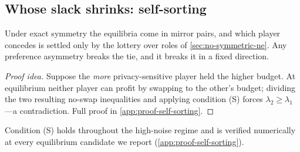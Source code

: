 \subsection{Whose slack shrinks: self-sorting}
\label{sec:self-sorting}

Under exact symmetry the equilibria come in mirror pairs, and which
player concedes is settled only by the lottery over roles of
\cref{sec:no-symmetric-ne}. Any preference asymmetry breaks the
tie, and it breaks it in a fixed direction.


\begin{proof}[Proof idea]
Suppose the \emph{more} privacy-sensitive player held the higher
budget. At equilibrium neither player can profit by swapping to the
other's budget; dividing the two resulting no-swap inequalities and
applying condition (S) forces $\lambda_2 \geq \lambda_1$---a
contradiction. Full proof in \cref{app:proof-self-sorting}.
\end{proof}

Condition (S) holds throughout the high-noise regime and is
verified numerically at every equilibrium candidate we report
(\cref{app:proof-self-sorting}).

